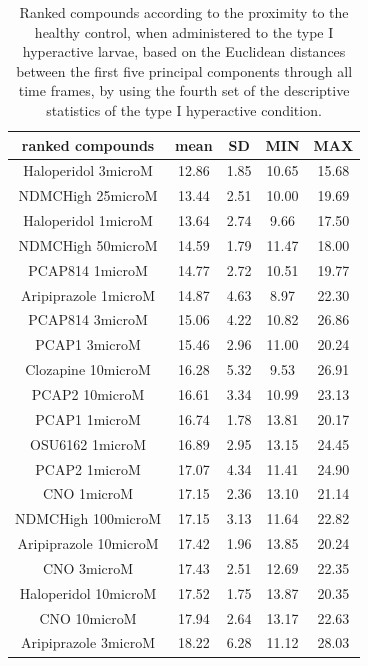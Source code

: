 \begin{table}[h!]\tiny
\centering
\caption{Ranked compounds according to the proximity to the healthy control, when administered to the type I hyperactive larvae, based on the Euclidean distances between the first five principal components through all time frames, by using the fourth set of the descriptive statistics of the type I hyperactive condition.}
\begin{tabular}{|c|c|c|c|c|}
\hline
ranked compounds             & mean & SD   & MIN  & MAX   \\ \hline
Haloperidol 3microM   & 12.86 & 1.85 & 10.65 & 15.68 \\ \hline
NDMCHigh 25microM     & 13.44 & 2.51 & 10.00    & 19.69 \\ \hline
Haloperidol 1microM   & 13.64 & 2.74 & 9.66  & 17.50  \\ \hline
NDMCHigh 50microM     & 14.59 & 1.79 & 11.47 & 18.00    \\ \hline
PCAP814 1microM       & 14.77 & 2.72 & 10.51 & 19.77 \\ \hline
Aripiprazole 1microM  & 14.87 & 4.63 & 8.97  & 22.30  \\ \hline
PCAP814 3microM       & 15.06 & 4.22 & 10.82 & 26.86 \\ \hline
PCAP1 3microM         & 15.46 & 2.96 & 11.00    & 20.24 \\ \hline
Clozapine 10microM    & 16.28 & 5.32 & 9.53  & 26.91 \\ \hline
PCAP2 10microM        & 16.61 & 3.34 & 10.99 & 23.13 \\ \hline
PCAP1 1microM         & 16.74 & 1.78 & 13.81 & 20.17 \\ \hline
OSU6162 1microM       & 16.89 & 2.95 & 13.15 & 24.45 \\ \hline
PCAP2 1microM         & 17.07 & 4.34 & 11.41 & 24.90  \\ \hline
CNO 1microM           & 17.15 & 2.36 & 13.10  & 21.14 \\ \hline
NDMCHigh 100microM    & 17.15 & 3.13 & 11.64 & 22.82 \\ \hline
Aripiprazole 10microM & 17.42 & 1.96 & 13.85 & 20.24 \\ \hline
CNO 3microM           & 17.43 & 2.51 & 12.69 & 22.35 \\ \hline
Haloperidol 10microM  & 17.52 & 1.75 & 13.87 & 20.35 \\ \hline
CNO 10microM          & 17.94 & 2.64 & 13.17 & 22.63 \\ \hline
Aripiprazole 3microM  & 18.22 & 6.28 & 11.12 & 28.03 \\ \hline

\end{tabular}
\end{table}
